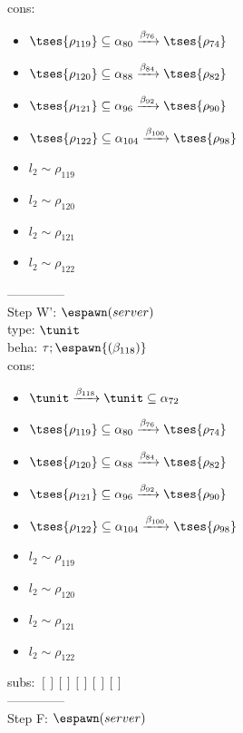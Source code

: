 \documentclass[12pt]{article}
\begin{document}
\\  cons: \begin{itemize}
\item $  \tses{ \rho_{119}} \subseteq \alpha_{80} \xrightarrow{\beta_{76}}  \tses{ \rho_{74}} $
\item $  \tses{ \rho_{120}} \subseteq \alpha_{88} \xrightarrow{\beta_{84}}  \tses{ \rho_{82}} $
\item $  \tses{ \rho_{121}} \subseteq \alpha_{96} \xrightarrow{\beta_{92}}  \tses{ \rho_{90}} $
\item $  \tses{ \rho_{122}} \subseteq \alpha_{104} \xrightarrow{\beta_{100}}  \tses{ \rho_{98}} $
\item $ l_{2} \sim\rho_{119} $
\item $ l_{2} \sim\rho_{120} $
\item $ l_{2} \sim\rho_{121} $
\item $ l_{2} \sim\rho_{122} $
\end{itemize} 
  --------------\\ 
Step W': $ \espawn (server) $\\
  type: $ \tunit $ 
\\  beha: $ \tau; \espawn{ (\beta_{118})} $ 
\\  cons: \begin{itemize}
\item $ \tunit \xrightarrow{\beta_{118}} \tunit \subseteq \alpha_{72} $
\item $  \tses{ \rho_{119}} \subseteq \alpha_{80} \xrightarrow{\beta_{76}}  \tses{ \rho_{74}} $
\item $  \tses{ \rho_{120}} \subseteq \alpha_{88} \xrightarrow{\beta_{84}}  \tses{ \rho_{82}} $
\item $  \tses{ \rho_{121}} \subseteq \alpha_{96} \xrightarrow{\beta_{92}}  \tses{ \rho_{90}} $
\item $  \tses{ \rho_{122}} \subseteq \alpha_{104} \xrightarrow{\beta_{100}}  \tses{ \rho_{98}} $
\item $ l_{2} \sim\rho_{119} $
\item $ l_{2} \sim\rho_{120} $
\item $ l_{2} \sim\rho_{121} $
\item $ l_{2} \sim\rho_{122} $
\end{itemize} 
  subs:  $ [ ] [] [] [] [] $  
 \\--------------\\ 
Step F: $ \espawn (server) $
\end{document}
